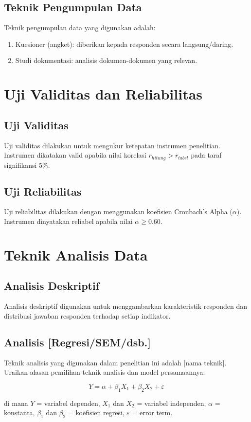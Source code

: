 \subsection{Teknik Pengumpulan Data}
Teknik pengumpulan data yang digunakan adalah:
\begin{enumerate}
  \item Kuesioner (angket): diberikan kepada responden secara langsung/daring.
  \item Studi dokumentasi: analisis dokumen-dokumen yang relevan.
\end{enumerate}

\section{Uji Validitas dan Reliabilitas}
\label{sec:uji-validitas-reliabilitas}

\subsection{Uji Validitas}
Uji validitas dilakukan untuk mengukur ketepatan instrumen penelitian. Instrumen
dikatakan valid apabila nilai korelasi $r_{hitung} > r_{tabel}$ pada taraf signifikansi
5\%.

\subsection{Uji Reliabilitas}
Uji reliabilitas dilakukan dengan menggunakan koefisien Cronbach's Alpha ($\alpha$).
Instrumen dinyatakan reliabel apabila nilai $\alpha \geq 0.60$.

\section{Teknik Analisis Data}
\label{sec:teknik-analisis}

\subsection{Analisis Deskriptif}
Analisis deskriptif digunakan untuk menggambarkan karakteristik responden dan
distribusi jawaban responden terhadap setiap indikator.

\subsection{Analisis [Regresi/SEM/dsb.]}
Teknik analisis yang digunakan dalam penelitian ini adalah [nama teknik]. Uraikan
alasan pemilihan teknik analisis dan model persamaannya:

\begin{equation}
Y = \alpha + \beta_1 X_1 + \beta_2 X_2 + \varepsilon
\label{eq:model-regresi}
\end{equation}

\noindent
di mana $Y$ = variabel dependen, $X_1$ dan $X_2$ = variabel independen, $\alpha$ =
konstanta, $\beta_1$ dan $\beta_2$ = koefisien regresi, $\varepsilon$ = error term.
